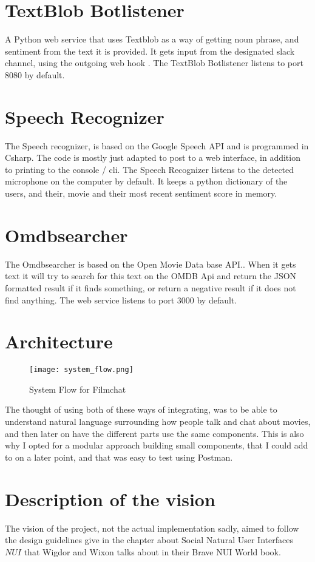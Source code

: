\documentclass[11pt,fleqn]{book} %
\begin{document}
\section{TextBlob Botlistener}
A Python web service that uses Textblob\cite{TextBlobTutorial:Documentation} as a way of getting noun phrase, and sentiment from the text it is provided. It gets input from the designated slack channel, using the outgoing web hook \cite{SlackOutgoingSlack}. The TextBlob Botlistener listens to port 8080 by default.

\section{Speech Recognizer}
The Speech recognizer, is based on the Google Speech API \cite{GoogleCloudPlatformSpeechPlatform} and is programmed in Csharp. The code is mostly just adapted to post to a web interface, in addition to printing to the console / cli. The Speech Recognizer listens to the detected microphone on the computer by default. It keeps a python dictionary of the users, and their, movie and their most recent sentiment score in memory.

\section{Omdbsearcher}
The Omdbsearcher is based on the Open Movie Data base API.\cite{OMDbDatabase}. When it gets text it will try to search for this text on the OMDB Api and return the JSON formatted result if it finds something, or return a negative result if it does not find anything. The web service listens to port 3000 by default.

\newpage
\section{Architecture}
\begin{figure}[]
  \centering
   \texttt{[image: system\_flow.png]}
  \caption{System Flow for Filmchat}
  \label{fig:system_flow}
\end{figure}
The thought of using both of these ways of integrating, was to be able to understand natural language surrounding how people talk and chat about movies, and then later on have the different parts use the same components. This is also why I opted for a modular approach building small components, that I could add to on a later point, and that was easy to test using Postman.

\section{Description of the vision}
The vision of the project, not the actual implementation sadly, aimed to follow the design guidelines give in the chapter about Social Natural User Interfaces \(NUI\) that Wigdor and Wixon talks about in their Brave NUI World book. \cite{WigdorBraveWorld}
\end{document}
